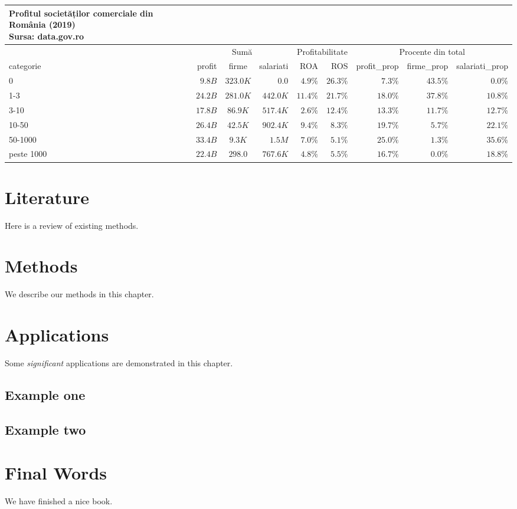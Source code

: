 \documentclass[
]{book}
\begin{document}
\captionsetup[table]{labelformat=empty,skip=1pt}
\begin{longtable}{lrcrrrrrr}
\caption*{
\large Profitul societăților comerciale din România (2019)\\ 
\small Sursa: data.gov.ro\\ 
} \\ 
\toprule
& \multicolumn{3}{c}{Sumă} & \multicolumn{2}{c}{Profitabilitate} & \multicolumn{3}{c}{Procente din total} \\ 
 \cmidrule(lr){2-4}\cmidrule(lr){5-6}\cmidrule(lr){7-9}
categorie & profit & firme & salariati & ROA & ROS & profit\_prop & firme\_prop & salariati\_prop \\ 
\midrule
0 & $9.8B$ & $323.0K$ & $0.0$ & $4.9\%$ & $26.3\%$ & $7.3\%$ & $43.5\%$ & $0.0\%$ \\ 
1-3 & $24.2B$ & $281.0K$ & $442.0K$ & $11.4\%$ & $21.7\%$ & $18.0\%$ & $37.8\%$ & $10.8\%$ \\ 
3-10 & $17.8B$ & $86.9K$ & $517.4K$ & $2.6\%$ & $12.4\%$ & $13.3\%$ & $11.7\%$ & $12.7\%$ \\ 
10-50 & $26.4B$ & $42.5K$ & $902.4K$ & $9.4\%$ & $8.3\%$ & $19.7\%$ & $5.7\%$ & $22.1\%$ \\ 
50-1000 & $33.4B$ & $9.3K$ & $1.5M$ & $7.0\%$ & $5.1\%$ & $25.0\%$ & $1.3\%$ & $35.6\%$ \\ 
peste 1000 & $22.4B$ & $298.0$ & $767.6K$ & $4.8\%$ & $5.5\%$ & $16.7\%$ & $0.0\%$ & $18.8\%$ \\ 
\bottomrule
\end{longtable}

\hypertarget{literature}{%
\chapter{Literature}\label{literature}}

Here is a review of existing methods.

\hypertarget{methods}{%
\chapter{Methods}\label{methods}}

We describe our methods in this chapter.

\hypertarget{applications}{%
\chapter{Applications}\label{applications}}

Some \emph{significant} applications are demonstrated in this chapter.

\hypertarget{example-one}{%
\section{Example one}\label{example-one}}

\hypertarget{example-two}{%
\section{Example two}\label{example-two}}

\hypertarget{final-words}{%
\chapter{Final Words}\label{final-words}}

We have finished a nice book.

  
\end{document}
